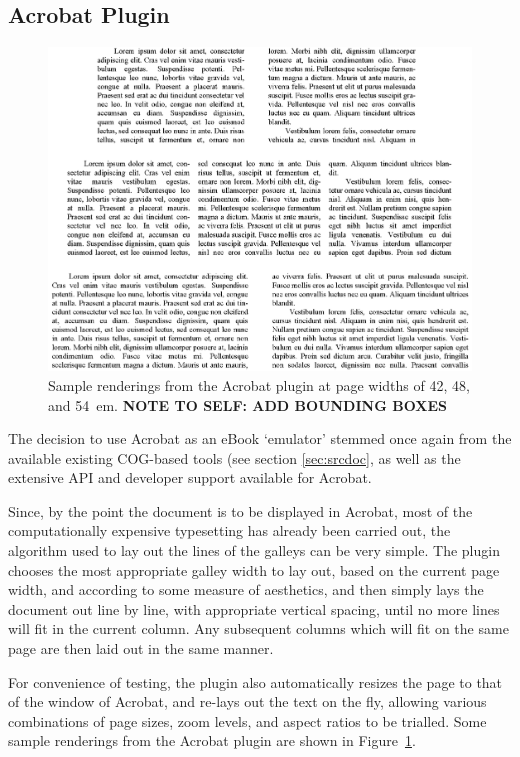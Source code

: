 \subsection{Acrobat Plugin}
\begin{figure}
 \includegraphics[width=\textwidth]{gfx/renderings}
 \caption[Sample renderings from the Acrobat plugin]{Sample renderings from the Acrobat plugin at page widths of 42, 48, and 54~em. \textbf{NOTE TO SELF: ADD BOUNDING BOXES}}
 \label{fig:renderings}
\end{figure}

The decision to use Acrobat as an eBook `emulator' stemmed once again from the available existing COG-based tools (see section \ref{sec:srcdoc}, as well as the extensive API and developer support available for Acrobat.

Since, by the point the document is to be displayed in Acrobat, most of the computationally expensive typesetting has already been carried out, the algorithm used to lay out the lines of the galleys can be very simple. The plugin chooses the most appropriate galley width to lay out, based on the current page width, and according to some measure of aesthetics, and then simply lays the document out line by line, with appropriate vertical spacing, until no more lines will fit in the current column. Any subsequent columns which will fit on the same page are then laid out in the same manner.

For convenience of testing, the plugin also automatically resizes the page to that of the window of Acrobat, and re-lays out the text on the fly, allowing various combinations of page sizes, zoom levels, and aspect ratios to be trialled.
Some sample renderings from the Acrobat plugin are shown in Figure~\ref{fig:renderings}.

